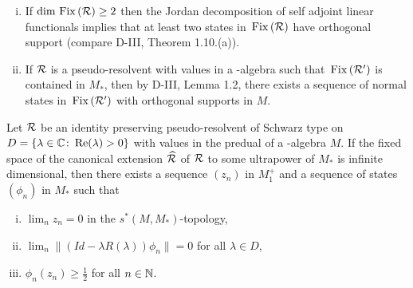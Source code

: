 \begin{remark}\label{rem:d4-4.2}
\begin{enumerate}[(i), wide]
\item
If $ \dim \mathop{}\mathrm{Fix}\left(\mathcal{R}\right) \geq 2 $  then the Jordan decomposition of self adjoint linear functionals implies that at least two states in $ \mathop{}\mathrm{Fix}\left(\mathcal{R}\right) $  have orthogonal support (compare D-III, Theorem 1.10.(a)).

\item
If $ \mathcal{R} $  is a pseudo-resolvent with values in a \WA-algebra such that $ \mathop{}\mathrm{Fix}\left(\mathcal{R}'\right) $  is contained in $ M_{*} $,  then by D-III, Lemma 1.2, there exists a sequence of normal states in $ \mathop{}\mathrm{Fix}\left(\mathcal{R}'\right) $  with orthogonal supports in $ M $.
\end{enumerate}
\end{remark}
\begin{lemma}\label{lem:d4-4.3}
Let $ \mathcal{R} $  be an identity preserving pseudo-resolvent of Schwarz type on $ D = \{\lambda \in \mathbb{C} \colon  \mathop{}\!\mathrm{Re}(\lambda) > 0\} $  with values in the predual of a \WA-algebra $ M $.
If the fixed space of the canonical extension $ \widehat{\mathcal{R}} $  of $ \mathcal{R} $  to some ultrapower of $ M_{*} $  is infinite dimensional, then there exists a sequence $ (z_{n}) $  in $ M_{1}^{+} $  and a sequence of states $ (\phi_{n}) $  in $ M_{*} $  such that
\begin{enumerate}[(i)]

\item\label{item:d4-4.3-i}
$ \lim_{n} z_{n} = 0 $  in the $ s^{*}(M,M_{*}) $-topology,

\item\label{item:d4-4.3-ii}
$ \lim_{n} \|(Id - \lambda R(\lambda))\phi_{n}\| = 0 $  for all $ \lambda \in D $,

\item\label{item:d4-4.3-iii}
$ \phi_{n}(z_{n}) \geq \frac{1}{2} $  for all $ n \in \mathbb{N} $. 
\end{enumerate}
\end{lemma}
